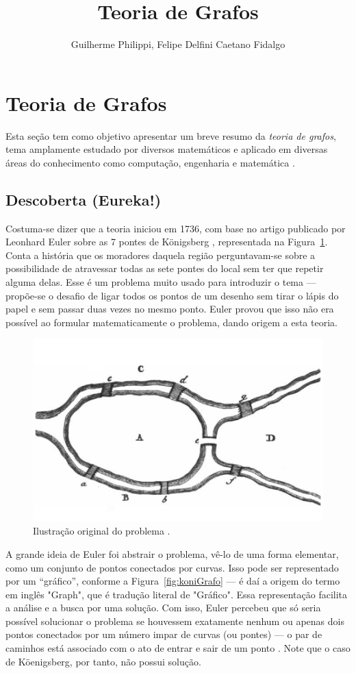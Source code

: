 \documentclass[a4paper,12pt]{article}
\title{Teoria de Grafos}
\author{Guilherme Philippi, Felipe Delfini Caetano Fidalgo}
\begin{document}
\maketitle
\tableofcontents

\section{Teoria de Grafos\label{sec:grafos}}
Esta seção tem como objetivo apresentar um breve resumo da \textit{teoria de grafos}, tema amplamente estudado por diversos matemáticos e aplicado em diversas áreas do conhecimento como computação, engenharia e matemática \cite{graphTheoryApplicationsBondy}.

\subsection{Descoberta (Eureka!)}
Costuma-se dizer que a teoria iniciou em 1736, com base no artigo publicado por Leonhard Euler sobre as 7 pontes de Königsberg \cite{euler:KOENIGSBERG} \cite{graphTheoryApplicationsBondy}, representada na Figura~\ref{fig:koni}. Conta a história que os moradores daquela região perguntavam-se sobre a possibilidade de atravessar todas as sete pontes do local sem ter que repetir alguma delas. Esse é um problema muito usado para introduzir o tema \cite{problemsInMath} --- propõe-se o desafio de ligar todos os pontos de um desenho sem tirar o lápis do papel e sem passar duas vezes no mesmo ponto. Euler provou que isso não era possível ao formular matematicamente o problema, dando origem a esta teoria.

\begin{figure}[H]
	\begin{center}
		\includegraphics[width=0.6\linewidth]{figures/koenigsbern.png}
	\end{center}
	\caption{Ilustração original do problema \cite{euler:KOENIGSBERG}.}
	\label{fig:koni}
\end{figure}

A grande ideia de Euler foi abstrair o problema, vê-lo de uma forma elementar, como um conjunto de pontos conectados por curvas. Isso pode ser representado por um ``gráfico'', conforme a Figura~\ref{fig:koniGrafo} --- é daí a origem do termo em inglês "Graph", que é tradução literal de "Gráfico". Essa representação facilita a análise e a busca por uma solução. Com isso, Euler percebeu que só seria possível solucionar o problema se houvessem exatamente nenhum ou apenas dois pontos conectados por um número impar de curvas (ou pontes) --- o par de caminhos está associado com o ato de entrar e sair de um ponto \cite{euler:KOENIGSBERG}. Note que o caso de Köenigsberg, por tanto, não possui solução.
\end{document}
